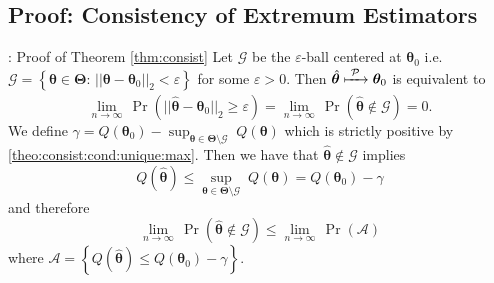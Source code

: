 \documentclass[envcountsect,usenames,dvipsnames]{beamer}
\theoremstyle{mystyle}
\begin{document}
\subsection{Proof: Consistency of Extremum Estimators}
\label{proof_thm_consist}

\begin{frame}{\thesubsection: Proof of Theorem \ref{thm:consist}}
	\small
			Let $\mathcal{G}$ be the $\varepsilon$-ball centered at $\bm{\theta}_0$ i.e. $\mathcal{G} = \left\{\bm{\theta} \in \bm{\Theta}  :\, || \bm{\theta} - \bm{\theta}_0 ||_2 < \varepsilon \right\}$ for some $\varepsilon > 0$. Then $\hat{\bm{\theta}} \xmapsto[\;\;\;\;\; ]{\mathcal{P}} \bm{\theta}_0$ is equivalent to 
			\begin{equation*}
				\lim_{n \rightarrow \infty} \, \Pr ( || \hat{\bm{\theta}} - \bm{\theta}_0 ||_2 \geq \varepsilon ) =  \lim_{n \rightarrow \infty} \,	\Pr (  \hat{\bm{\theta}} \notin \mathcal{G} ) = 0.
			\end{equation*}
			We define $\gamma = Q(\bm{\theta}_0) - \sup_{\bm{\theta \in \bm{\Theta}} \setminus \mathcal{G}} \; Q(\bm{\theta})$ which is strictly positive by \ref{theo:consist:cond:unique:max}. Then we have that $\hat{\bm{\theta}} \notin \mathcal{G}$ implies
			\begin{equation*}
				Q(\hat{\bm{\theta}}) \leq \sup_{\bm{\theta \in \bm{\Theta}} \setminus \mathcal{G}} \; Q(\bm{\theta}) = Q (\bm{\theta}_0) - \gamma
			\end{equation*}
			and therefore
			\begin{equation*}
				\lim_{n \rightarrow \infty} \,	\Pr (  \hat{\bm{\theta}} \notin \mathcal{G} ) \leq \lim_{n \rightarrow \infty} \,	\Pr (  \mathcal{A} )
			\end{equation*}
			where $\mathcal{A} = \left\{ Q(\hat{\bm{\theta}}) \leq Q (\bm{\theta}_0) - \gamma\right\}$.
\end{frame}
\end{document}
